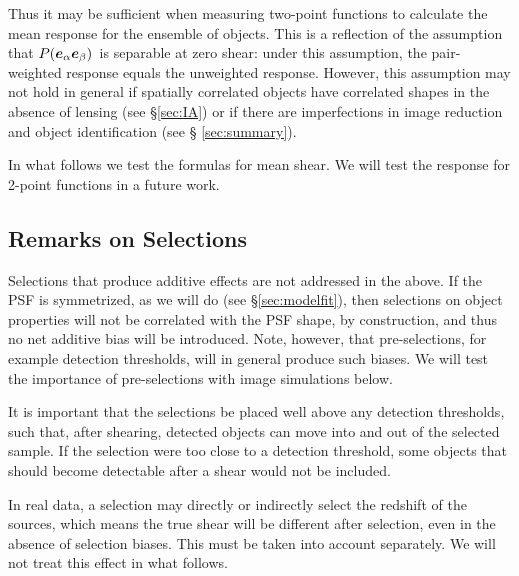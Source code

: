\documentclass[iop]{emulateapj}
\newcommand{\vest}{\mbox{\boldmath $e$}}
\newcommand{\mcalRscalarmean}{\mbox{$\langle R \rangle$}}
\newcommand{\probe}{\mbox{$P(\vest_\alpha \vest_\beta)$}}
\begin{document}
Thus it may be sufficient when measuring two-point functions to calculate the
mean response for the ensemble of objects.  This is a reflection of the
assumption that \probe\ is separable at zero shear: under this assumption, the
pair-weighted response equals the unweighted response.  However, this
assumption may not hold in general if spatially correlated objects have
correlated shapes in the absence of lensing (see \S \ref{sec:IA}) or if there
are imperfections in image reduction and object identification (see \S
\ref{sec:summary}).


In what follows we test the formulas for mean shear.  We will test the
response for 2-point functions in a future work.

\subsection{Remarks on Selections}

Selections that produce additive effects are not addressed in the above.  If
the PSF is symmetrized, as we will do (see \S \ref{sec:modelfit}), then
selections on object properties will not be correlated with the PSF shape, by
construction, and thus no net additive bias will be introduced. Note, however,
that pre-selections, for example detection thresholds, will in general produce
such biases.  We will test the importance of pre-selections with image
simulations below.


It is important that the selections be placed well above any detection
thresholds, such that, after shearing, detected objects can move into and out
of the selected sample.  If the selection were too close to a detection
threshold, some objects that should become detectable after
a shear would not be included.

In real data, a selection may directly or indirectly select the redshift of the
sources, which means the true shear will be different after selection, even in
the absence of selection biases.  This must be taken into account separately.
We will not treat this effect in what follows.
\end{document}
